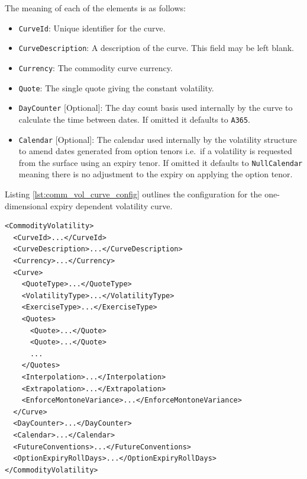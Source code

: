 The meaning of each of the elements is as follows:
\begin{itemize}
\item \lstinline!CurveId!: Unique identifier for the curve.
\item \lstinline!CurveDescription!: A description of the curve. This field may be left blank.
\item \lstinline!Currency!: The commodity curve currency.
\item \lstinline!Quote!: The single quote giving the constant volatility.
\item \lstinline!DayCounter! [Optional]: The day count basis used internally by the curve to calculate the time between dates. If omitted it defaults to \lstinline!A365!.
\item \lstinline!Calendar! [Optional]: The calendar used internally by the volatility structure to amend dates generated from option tenors i.e.\ if a volatility is requested from the surface using an expiry tenor. If omitted it defaults to \lstinline!NullCalendar! meaning there is no adjustment to the expiry on applying the option tenor.
\end{itemize}

Listing \ref{lst:comm_vol_curve_config} outlines the configuration for the one-dimensional expiry dependent volatility curve.

\begin{longlisting}
\begin{verbatim}
<CommodityVolatility>
  <CurveId>...</CurveId>
  <CurveDescription>...</CurveDescription>
  <Currency>...</Currency>
  <Curve>
    <QuoteType>...</QuoteType>
    <VolatilityType>...</VolatilityType>
    <ExerciseType>...</ExerciseType>
    <Quotes>
      <Quote>...</Quote>
      <Quote>...</Quote>
      ...
    </Quotes>
    <Interpolation>...</Interpolation>
    <Extrapolation>...</Extrapolation>
    <EnforceMontoneVariance>...</EnforceMontoneVariance>
  </Curve>
  <DayCounter>...</DayCounter>
  <Calendar>...</Calendar>
  <FutureConventions>...</FutureConventions>
  <OptionExpiryRollDays>...</OptionExpiryRollDays>
</CommodityVolatility>
\end{verbatim}
\caption{Commodity volatility curve configuration}
\label{lst:comm_vol_curve_config}
\end{longlisting}


